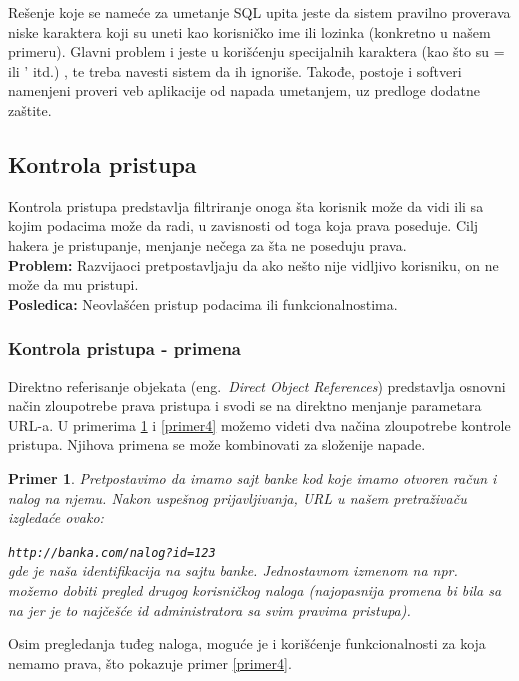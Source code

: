 \documentclass[a4paper]{article}
\newtheorem{primer}{Primer}[section]
\begin{document}
Rešenje koje se nameće za umetanje SQL upita \cite{SQL_prev} jeste da sistem pravilno proverava niske karaktera koji su uneti kao korisničko ime ili lozinka (konkretno u našem primeru). Glavni problem i jeste u korišćenju specijalnih karaktera (kao što su = ili ' itd.) \cite{Sanit} , te treba navesti sistem da ih ignoriše. Takođe, postoje i softveri namenjeni proveri  veb aplikacije od napada umetanjem, uz predloge dodatne zaštite.

\subsection{Kontrola pristupa}

Kontrola pristupa \cite{AC} predstavlja filtriranje onoga šta korisnik može da vidi ili sa kojim podacima može da radi, u zavisnosti od toga koja prava poseduje. Cilj hakera je pristupanje, menjanje nečega za šta ne poseduju prava.\\
\textbf{Problem:} Razvijaoci pretpostavljaju da ako nešto nije vidljivo korisniku, on ne može da mu pristupi.\\
\textbf{Posledica:} Neovlašćen pristup podacima ili funkcionalnostima.

\subsubsection{Kontrola pristupa - primena}

Direktno referisanje objekata (eng.~{\em Direct Object References}) predstavlja osnovni način zloupotrebe prava pristupa i svodi se na direktno menjanje parametara URL-a. U primerima \ref{primer3} i \ref{primer4} možemo videti dva načina zloupotrebe kontrole pristupa. Njihova primena se može kombinovati za složenije napade.
\begin{primer}
\label{primer3}
Pretpostavimo da imamo sajt banke kod koje imamo otvoren račun i nalog na njemu. Nakon uspešnog prijavljivanja, URL u našem pretraživaču izgledaće ovako:

\texttt{http://banka.com/nalog?id=123}\\
gde je  naša identifikacija na sajtu banke. Jednostavnom izmenom  na npr.  možemo dobiti pregled drugog korisničkog naloga (najopasnija promena bi bila sa  na  jer je to najčešće id administratora sa svim pravima pristupa).
\end{primer}
Osim pregledanja tuđeg naloga, moguće je i korišćenje funkcionalnosti za koja nemamo prava, što pokazuje primer \ref{primer4}.
\end{document}
